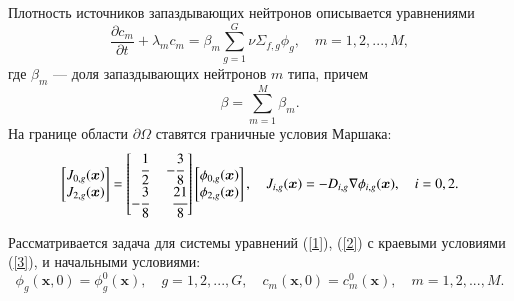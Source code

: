\documentclass{crm-article}
\begin{document}
Плотность источников запаздывающих нейтронов описывается уравнениями
\begin{equation}\label{2}
 \frac{\partial c_m}{\partial t} + \lambda_m c_m = \beta_m \sum_{g=1}^{G} \nu \Sigma_{f,g} \phi_g,
 \quad m = 1,2, ..., M, 
\end{equation}
где $\beta_m$ --- доля запаздывающих нейтронов  $m$ типа, причем
\[
 \beta = \sum_{m=1}^{M} \beta_m.
\] 
На границе области $\partial \Omega$ ставятся граничные условия Маршака:
\begin{equation}\label{3}
\begin{split}
\begin{bmatrix}
J_{0,g}(\bm x)\\
J_{2,g}(\bm x)\\
\end{bmatrix}
=
\begin{bmatrix}
\phantom{-}\cfrac{1}{2} & -\cfrac{3}{8} \\
 -\cfrac{3}{8} & \phantom{-}\cfrac{21}{8} \\
\end{bmatrix}
\begin{bmatrix}
\phi_{0,g}(\bm x) \\
\phi_{2,g}(\bm x) \\
\end{bmatrix},
\quad
J_{i,g}(\bm x) = -D_{i,g}\nabla\phi_{i,g}(\bm x), 
\quad
i = 0, 2.
\end{split}
\end{equation}

Рассматривается задача для системы уравнений (\ref{1}), (\ref{2}) с краевыми условиями (\ref{3}), и начальными условиями:
\begin{equation}\label{4}
 \phi_g(\bm x,0) = \phi_g^0(\bm x), 
  \quad  g = 1,2, ..., G ,
 \quad   c_m(\bm x,0) = c_m^0(\bm x), 
  \quad  m = 1,2, ..., M.
\end{equation}
\end{document}
